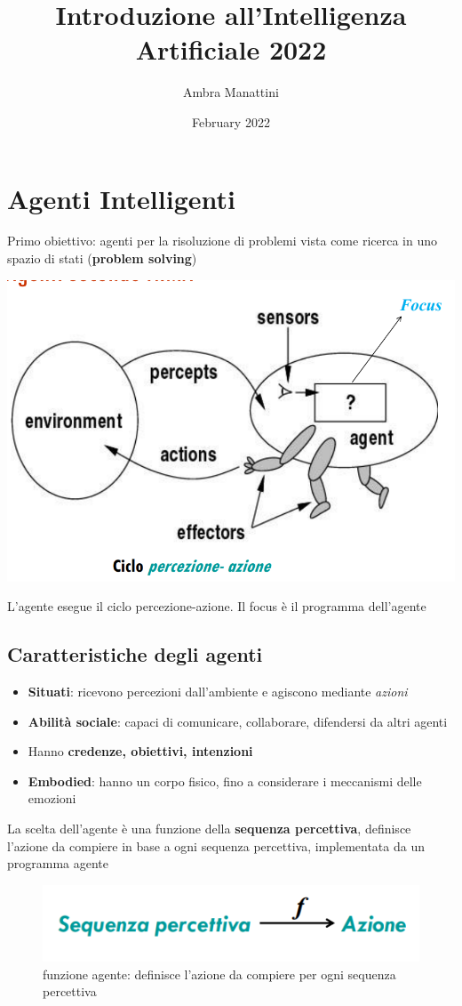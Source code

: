 \documentclass{article}
\title{Introduzione all'Intelligenza Artificiale 2022}
\author{Ambra Manattini}
\date{February 2022}
\begin{document}
\maketitle

\section{Agenti Intelligenti}
Primo obiettivo: agenti per la risoluzione di problemi vista come ricerca in uno spazio di stati (\textbf{problem solving})

\includegraphics[width=\linewidth]{1.png}

L'agente esegue il ciclo percezione-azione. Il focus è il programma dell'agente

\subsection{Caratteristiche degli agenti}
\begin{itemize}
    \item \textbf{Situati}: ricevono percezioni dall'ambiente e agiscono mediante \textit{azioni}
    \item \textbf{Abilità sociale}: capaci di comunicare, collaborare, difendersi da altri agenti
    \item Hanno \textbf{credenze, obiettivi, intenzioni}
    \item \textbf{Embodied}: hanno un corpo fisico, fino a considerare i meccanismi delle emozioni
\end{itemize}

La scelta dell'agente è una funzione della \textbf{sequenza percettiva}, definisce l'azione da compiere in base a ogni sequenza percettiva, implementata da un programma agente
\begin{figure}
    \centering
    \includegraphics[width = \linewidth]{2.png}
    \caption{funzione agente: definisce l'azione da compiere per ogni sequenza percettiva}
    \label{fig:my_label}
\end{figure}
\end{document}
